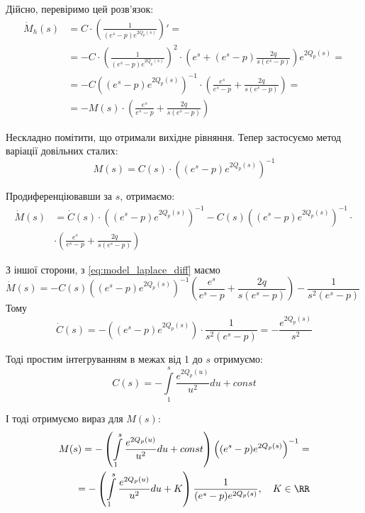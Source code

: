 Дійсно, перевіримо цей розв'язок:
\[
\begin{split}
\dot M_h (s) &= C \cdot \left(\frac{1}{(e^s - p)  e^{2Q_p(s)}}\right)'=\\
&= - C \cdot \left(\frac{1}{(e^s - p)  e^{2Q_p(s)}}\right)^2 \cdot \left(e^s  + (e^s - p) \frac{2q}{s(e^s - p)}   \right) e^{2Q_p(s)} =\\
&= -C \left((e^s - p)  e^{2Q_p(s)}\right)^{-1} \cdot \left(\frac{e^s}{e^s - p}  + \frac{2q}{s(e^s - p)}   \right) =\\
&= - M(s) \cdot \left(\frac{e^s}{e^s - p}  + \frac{2q}{s(e^s - p)}   \right)
\end{split}
\]

Нескладно помітити, що отримали вихідне рівняння. Тепер застосуємо метод варіації довільних сталих:
$$
M(s) = C(s) \cdot \left((e^s - p)  e^{2Q_p(s)}\right)^{-1} 
$$

Продиференціювавши за $s$, отримаємо:
\begin{align*}
\dot M(s) &= \dot C(s) \cdot \left((e^s - p)  e^{2Q_p(s)}\right)^{-1} -C(s) \left((e^s - p)  e^{2Q_p(s)}\right)^{-1} \cdot \\
&\cdot \left(\frac{e^s}{e^s - p}  + \frac{2q}{s(e^s - p)}   \right) 
\end{align*}

З іншої сторони, з \eqref{eq:model_laplace_diff} маємо
$$
\dot M(s) = - C(s) \left((e^s - p)  e^{2Q_p(s)}\right)^{-1}  \left(\frac{e^s}{e^s - p} + \frac{2q}{s(e^s - p)}\right) - \frac{1}{s^2(e^s - p)} \quad	
$$
Тому
$$
\dot C(s) = - \left((e^s - p)  e^{2Q_p(s)}\right) \cdot  \frac{1}{s^2(e^s - p)} =  - \frac{e^{2Q_p(s)}}{s^2}
$$

Тоді простим інтегруванням в межах від 1 до $s$ отримуємо:
\begin{equation}
C(s) = -  \int\limits_1^s \frac{e^{2Q_p(u)}}{u^2} du + const
\end{equation}

І тоді отримуємо вираз для $M(s)$:
\begin{equation}
\begin{split}
M(s)=- \left( \int\limits_1^s \frac{e^{2Q_p(u)}}{u^2} du + const \right) \left((e^s - p)  e^{2Q_p(s)}\right)^{-1}  =\\
= - \left( \int\limits_1^s \frac{e^{2Q_p(u)}}{u^2} du + K \right) \frac{1}{(e^s - p)  e^{2Q_p(s)}}, \quad K \in \RR
\end{split}
\end{equation}

